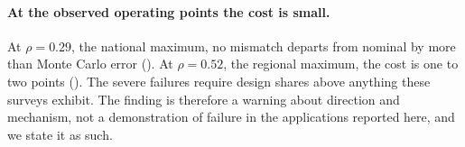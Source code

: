 \paragraph{At the observed operating points the cost is small.} At
$\rho=0.29$, the national maximum, no mismatch departs from nominal by more
than Monte Carlo error (\ShapeRealNat). At $\rho=0.52$, the regional maximum,
the cost is one to two points (\ShapeRealReg). The severe failures require
design shares above anything these surveys exhibit. The finding is therefore a
warning about direction and mechanism, not a demonstration of failure in the
applications reported here, and we state it as such.

